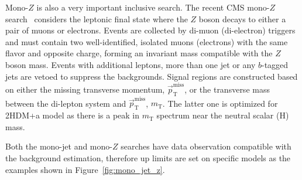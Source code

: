 \documentclass{moriond}
\def\mt{m_{\mathrm{T}}}
\def\ptmiss{\vec{p}_\mathrm{T}^{\mathrm{miss}}}
\begin{document}
Mono-$Z$ is also a very important inclusive search. The recent CMS mono-$Z$
search~\cite{monoz} considers the leptonic final state where the $Z$ boson
decays to either a pair of muons or electrons. Events are collected by di-muon
(di-electron) triggers and must contain two well-identified, isolated muons
(electrons) with the same flavor and opposite charge, forming an invariant mass
compatible with the $Z$ boson mass. Events with additional leptons, more than
one jet or any $b$-tagged jets are vetoed to suppress the backgrounds. Signal
regions are constructed based on either the missing transverse momentum,
$\ptmiss$, or the transverse mass between the di-lepton system and $\ptmiss$,
$\mt$. The latter one is optimized for 2HDM+a model as there is a peak in $\mt$
spectrum near the neutral scalar (H) mass.

Both the mono-jet and mono-$Z$ searches have data observation compatible with the background estimation, therefore up limits are set on specific models as the examples shown in Figure~\ref{fig:mono_jet_z}. 
\end{document}
